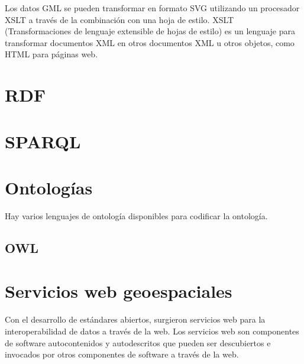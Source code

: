 
Los datos GML se pueden transformar en formato SVG utilizando un procesador XSLT a través de la combinación con una hoja de estilo. XSLT (Transformaciones de lenguaje extensible de hojas de estilo) es un lenguaje para transformar documentos XML en otros documentos XML u otros objetos, como HTML para páginas web.


\section{RDF}

\section{SPARQL}

\section{Ontologías}







Hay varios lenguajes de ontología disponibles para codificar la ontología.

\subsection{OWL}







\section{Servicios web geoespaciales}

Con el desarrollo de estándares abiertos, surgieron servicios web para la interoperabilidad de datos a través de la web. Los servicios web son componentes de software autocontenidos y autodescritos que pueden ser descubiertos e invocados por otros componentes de software a través de la web.




